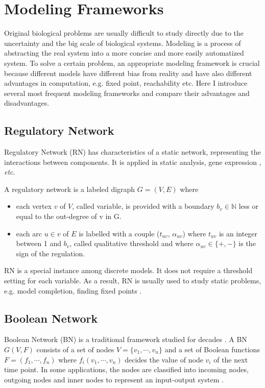 \section{Modeling Frameworks}
Original biological problems are usually difficult to study directly due to the uncertainty and the big scale of biological systems. 
Modeling is a process of abstracting the real system into a more concise and more easily automatized system.
To solve a certain problem, an appropriate modeling framework is crucial because different models have different bias from reality and have also different advantages in computation, e.g. fixed point, reachability etc.
Here I introduce several most frequent modeling frameworks and compare their advantages and disadvantages.

\subsection{Regulatory Network}\label{sec:regNetwork}
Regulatory Network (RN) has characteristics of a static network, representing the interactions between components.
It is applied in static analysis, gene expression \cite{shinozaki2003regulatory}, \textit{etc}.

\begin{definition}\label{def:RN}
A regulatory network is a labeled digraph $G=(V,E)$ where 
\begin{itemize}
    \item each vertex $v$ of $V$, called variable, is provided with a boundary $b_v\in \mathbb{N}$ less or equal to the out-degree of v in G.
    \item each arc $u\in v$ of $E$ is labelled with a couple ($t_{uv}$, $\alpha_{uv}$) where $t_{uv}$ is an integer between 1 and $b_v$, called qualitative threshold and where $\alpha_{uv}\in \{+,-\}$ is the sign of the regulation.
\end{itemize}
\end{definition}

RN is a special instance among discrete models.
It does not require a threshold setting for each variable.
As a result, RN is usually used to study static problems, e.g. model completion, finding fixed points \cite{yamamoto2014completing}.

\subsection{Boolean Network}
Boolean Network (BN) is a traditional framework studied for decades \cite{kauffman1969}.
A BN $G(V,F)$ consists of a set of nodes $V=\{v_1,\cdots,v_n\}$ and a set of Boolean functions $F=(f_1,\cdots,f_n)$ where $f_i(v_1,\cdots,v_n)$ decides the value of node $v_i$ of the next time point.
In some applications, the nodes are classified into incoming nodes, outgoing nodes and inner nodes to represent an input-output system \cite{akutsu2007control}.

